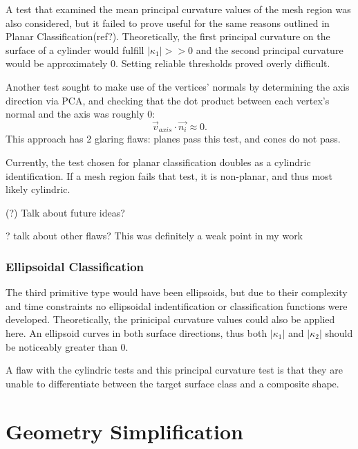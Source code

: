 A test that examined the mean principal curvature values of the mesh region was also considered, but it failed to prove useful for the same reasons outlined in Planar Classification(ref?).
Theoretically, the first principal curvature on the surface of a cylinder would fulfill $|\kappa_1| >> 0$ and the second principal curvature would be approximately 0.
Setting reliable thresholds proved overly difficult.

Another test sought to make use of the vertices' normals by determining the axis direction via PCA, and checking that the dot product between each vertex's normal and the axis was roughly 0:
\begin{equation}
	\vec{v}_{axis} \cdot \vec{n_i} \approx 0.
\end{equation}
This approach has 2 glaring flaws: planes pass this test, and cones do not pass.

Currently, the test chosen for planar classification doubles as a cylindric identification.
If a mesh region fails that test, it is non-planar, and thus most likely cylindric.

(?) Talk about future ideas?

? talk about other flaws? This was definitely a weak point in my work

\subsubsection{Ellipsoidal Classification}
The third primitive type would have been ellipsoids, but due to their complexity and time constraints no ellipsoidal indentification or classification functions were developed.
Theoretically, the prinicipal curvature values could also be applied here.
An ellipsoid curves in both surface directions, thus both $|\kappa_1|$ and $|\kappa_2|$ should be noticeably greater than 0.

A flaw with the cylindric tests and this principal curvature test is that they are unable to differentiate between the target surface class and a composite shape.

\section{Geometry Simplification}

